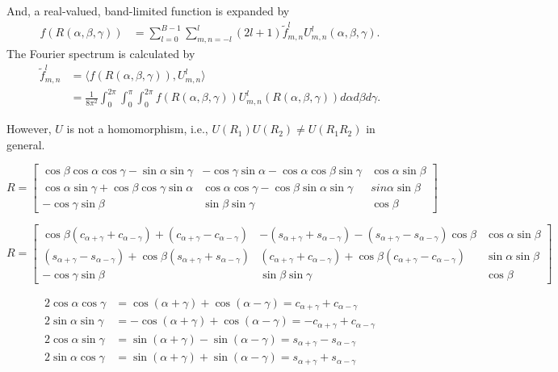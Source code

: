 \documentclass[onecolumn,11pt]{ieeetran}
\newcommand{\pair}[1]{\ensuremath{\langle #1 \rangle}}
\begin{document}
And, a real-valued, band-limited function is expanded by
\begin{align}
f(R(\alpha,\beta,\gamma)) &= \sum_{l=0}^{B-1} \sum_{m,n=-l}^l (2l+1)\tilde f^l_{m,n} U^l_{m,n}(\alpha,\beta,\gamma).\label{eqn:fB_real}
\end{align}
The Fourier spectrum is calculated by
\begin{align}
\tilde f^l_{m,n} & = \pair{f(R(\alpha,\beta,\gamma)), U^l_{m,n}}\nonumber\\
& =\frac{1}{8\pi^2}\int_0^{2\pi}\int_{0}^\pi\int_0^{2\pi} f(R(\alpha,\beta,\gamma)) U^{l}_{m,n}(R(\alpha,\beta,\gamma)) d\alpha d\beta d\gamma.\label{eqn:f_FT_real}
\end{align}

However, $U$ is not a homomorphism, i.e., $U(R_1)U(R_2)\neq U(R_1R_2)$ in general. 


\[
R=
\begin{bmatrix}
\cos\beta \cos\alpha\cos\gamma - \sin\alpha\sin\gamma& - \cos\gamma\sin\alpha - \cos\alpha\cos\beta\sin\gamma& \cos\alpha\sin\beta\\
\cos\alpha\sin\gamma + \cos\beta\cos\gamma\sin\alpha&   \cos\alpha\cos\gamma - \cos\beta\sin\alpha\sin\gamma& sin\alpha\sin\beta\\
-\cos\gamma\sin\beta&	\sin\beta\sin\gamma &\cos\beta
\end{bmatrix}
\]

\[
R=
\begin{bmatrix}
\cos\beta (c_{\alpha+\gamma}+c_{\alpha-\gamma}) +(c_{\alpha+\gamma}-c_{\alpha-\gamma})& - (s_{\alpha+\gamma}+s_{\alpha-\gamma}) - (s_{\alpha+\gamma}-s_{\alpha-\gamma})\cos\beta& \cos\alpha\sin\beta\\
(s_{\alpha+\gamma}-s_{\alpha-\gamma}) + \cos\beta(s_{\alpha+\gamma}+s_{\alpha-\gamma})&   (c_{\alpha+\gamma}+c_{\alpha-\gamma}) + \cos\beta(c_{\alpha+\gamma}-c_{\alpha-\gamma})& \sin\alpha\sin\beta\\
-\cos\gamma\sin\beta&	\sin\beta\sin\gamma &\cos\beta
\end{bmatrix}
\]

\begin{align*}
2\cos\alpha\cos\gamma  &=\cos(\alpha+\gamma)+\cos(\alpha-\gamma)=c_{\alpha+\gamma}+c_{\alpha-\gamma}\\
2\sin\alpha\sin\gamma  &=-\cos(\alpha+\gamma)+\cos(\alpha-\gamma)=-c_{\alpha+\gamma}+c_{\alpha-\gamma}\\
2\cos\alpha\sin\gamma  &=\sin(\alpha+\gamma)-\sin(\alpha-\gamma)=s_{\alpha+\gamma}-s_{\alpha-\gamma}\\
2\sin\alpha\cos\gamma  &=\sin(\alpha+\gamma)+\sin(\alpha-\gamma)=s_{\alpha+\gamma}+s_{\alpha-\gamma}\\
\end{align*}
\end{document}
